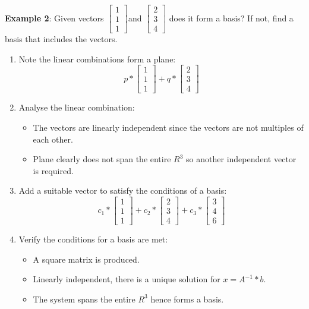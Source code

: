 \documentclass[10pt,a4paper]{article}
\begin{document}
\textbf{Example 2}: Given vectors $\begin{bmatrix}
    1\\ 
    1\\ 
    1
    \end{bmatrix}$and $\begin{bmatrix}
        2\\ 
        3\\ 
        4
        \end{bmatrix}$ does it form a basis? If not, find a basis that includes the vectors.

\begin{enumerate}
    \item Note the linear combinations form a plane: 
    $$p*
    \begin{bmatrix}
        1\\ 
        1\\ 
        1
    \end{bmatrix} + q*
    \begin{bmatrix}
            2\\ 
            3\\ 
            4
    \end{bmatrix}
    $$

    \item Analyse the linear combination:
    \begin{itemize}
        \item The vectors are linearly independent since the vectors are not multiples of each other.
        \item Plane clearly does not span the entire $R^3$ so another independent vector is required.
    \end{itemize}

    \item Add a suitable vector to satisfy the conditions of a basis:
    $$
    c_1*\begin{bmatrix}
        1\\ 
        1\\ 
        1
        \end{bmatrix} + 
    c_2*\begin{bmatrix}
        2\\ 
        3\\ 
        4
        \end{bmatrix} + 
    c_3*\begin{bmatrix}
        3\\ 
        4\\ 
        6
        \end{bmatrix}
    $$

    \item Verify the conditions for a basis are met:
    \begin{itemize}
        \item A square matrix is produced.
        \item Linearly independent, there is a unique solution for $x=A^{-1}*b$.
        \item The system spans the entire $R^3$ hence forms a basis.
    \end{itemize}
\end{enumerate}
\end{document}
